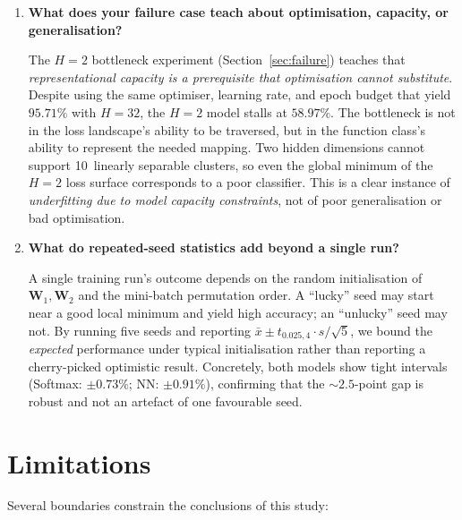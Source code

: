 \documentclass[11pt]{article}
\newcommand{\bW}{\mathbf{W}}
\begin{document}
\begin{enumerate}[leftmargin=2em,itemsep=0.5em]
\item \textbf{What does your failure case teach about optimisation, capacity, or generalisation?}

The $H{=}2$ bottleneck experiment (Section~\ref{sec:failure}) teaches that
\emph{representational capacity is a prerequisite that optimisation cannot substitute}.  Despite
using the same optimiser, learning rate, and epoch budget that yield $95.71\%$ with $H{=}32$, the
$H{=}2$ model stalls at $58.97\%$.  The bottleneck is not in the loss landscape's ability to be
traversed, but in the function class's ability to represent the needed mapping.  Two hidden
dimensions cannot support 10~linearly separable clusters, so even the global minimum of the
$H{=}2$ loss surface corresponds to a poor classifier.  This is a clear instance of
\emph{underfitting due to model capacity constraints}, not of poor generalisation or bad
optimisation.

\item \textbf{What do repeated-seed statistics add beyond a single run?}

A single training run's outcome depends on the random initialisation of~$\bW_1,\bW_2$ and the
mini-batch permutation order.  A ``lucky'' seed may start near a good local minimum and yield
high accuracy; an ``unlucky'' seed may not.  By running five seeds and reporting
$\bar{x}\pm t_{0.025,4}\cdot s/\!\sqrt{5}$, we bound the \emph{expected} performance under
typical initialisation rather than reporting a cherry-picked optimistic result.  Concretely,
both models show tight intervals (Softmax: $\pm 0.73\%$; NN: $\pm 0.91\%$), confirming that
the ${\sim}2.5$-point gap is robust and not an artefact of one favourable seed.

\end{enumerate}

\section{Limitations}

Several boundaries constrain the conclusions of this study:
\end{document}
